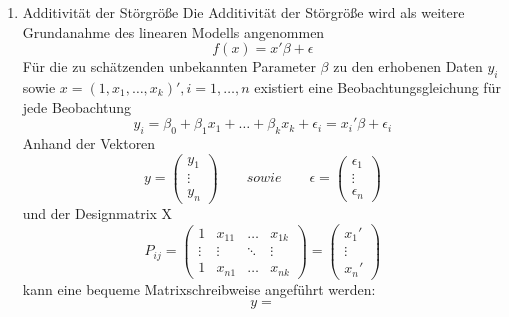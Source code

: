 \documentclass[11pt]{report}
\begin{document}
\begin{enumerate}
\item Additivität der Störgröße
Die Additivität der Störgröße wird als weitere Grundanahme des linearen Modells  angenommen
\begin{equation}
f(x) = x'\beta + \epsilon
\end{equation}
Für die zu schätzenden unbekannten Parameter \textbf{$\beta$} zu den erhobenen Daten $y_i$ sowie $x=(1,x_1,\dots,x_k)', i=1,\dots,n$ existiert eine Beobachtungsgleichung für jede Beobachtung 
\begin{equation}
y_i = \beta_0 + \beta_1 x_1 +  \dots + \beta_k x_k + \epsilon_i = x_i'\beta + \epsilon_i
\end{equation}
Anhand der  Vektoren
\begin{equation}
y=\left(\begin{array}{c}y_1\\ \vdots \\ y_n \end{array} \right) \qquad sowie \qquad \epsilon = \left(\begin{array}{c}\epsilon_1\\ \vdots \\ \epsilon_n \end{array} \right)
\end{equation}
und der Designmatrix X 
\begin{equation}
P_{ij} = \left( \begin{array}{cccc} 1 & x_{11} & \ldots & x_{1k} \\ \vdots & \vdots & \ddots & \vdots \\ 1 & x_{n1} & \dots & x_{nk} \end{array} \right) = \left(\begin{array}{c}x_1' \\ \vdots \\ x_n' \end{array} \right)
\end{equation}
kann eine bequeme Matrixschreibweise angeführt werden:
\begin{equation}
y=
\end{equation}
\end{enumerate}

% 
\end{document}
